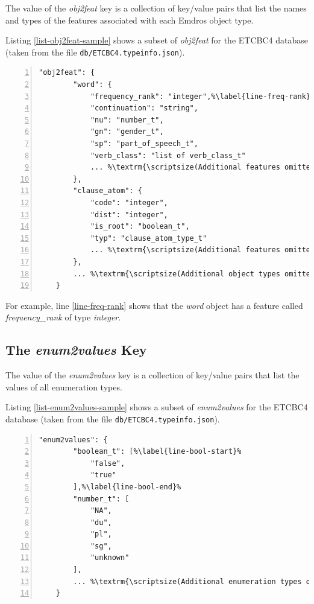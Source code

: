 \documentclass[11pt,oneside,a4paper]{memoir}
\begin{document}
The value of the \emph{obj2feat} key is a collection of key/value pairs that list the names and
types of the features associated with each Emdros object type.

Listing \ref{list-obj2feat-sample} shows a subset of \emph{obj2feat} for the ETCBC4 database (taken
from the file \texttt{db/ETCBC4.typeinfo.json}).

\begin{lstlisting}[numbers=left,caption=A sample obj2feat value,label=list-obj2feat-sample]
    "obj2feat": {
        "word": {
            "frequency_rank": "integer",%\label{line-freq-rank}%
            "continuation": "string",
            "nu": "number_t",
            "gn": "gender_t",
            "sp": "part_of_speech_t",
            "verb_class": "list of verb_class_t"
            ... %\textrm{\scriptsize(Additional features omitted)}%
        },
        "clause_atom": {
            "code": "integer",
            "dist": "integer",
            "is_root": "boolean_t",
            "typ": "clause_atom_type_t"
            ... %\textrm{\scriptsize(Additional features omitted)}%
        },
        ... %\textrm{\scriptsize(Additional object types omitted)}%
    }
\end{lstlisting}

For example, line \ref{line-freq-rank} shows that the \emph{word} object has a feature called
\emph{frequency\_rank} of type \emph{integer}.

\subsection{The \emph{enum2values} Key}\label{enum2values}

The value of the \emph{enum2values} key is a collection of key/value pairs that list the values of
all enumeration types.

Listing \ref{list-enum2values-sample} shows a subset of \emph{enum2values} for the ETCBC4 database
(taken from the file \texttt{db/ETCBC4.typeinfo.json}).

\begin{lstlisting}[numbers=left,caption=A sample enum2values value,label=list-enum2values-sample]
    "enum2values": {
        "boolean_t": [%\label{line-bool-start}%
            "false",
            "true"
        ],%\label{line-bool-end}%
        "number_t": [
            "NA",
            "du",
            "pl",
            "sg",
            "unknown"
        ],
        ... %\textrm{\scriptsize(Additional enumeration types omitted)}%
    }
\end{lstlisting}
\end{document}
